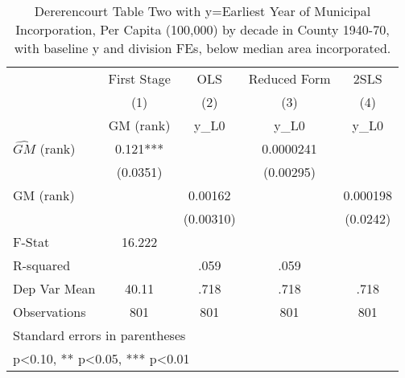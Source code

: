 \begin{table}[htbp]\centering
\def\sym#1{\ifmmode^{#1}\else\(^{#1}\)\fi}
\caption{Dererencourt Table Two with y=Earliest Year of Municipal Incorporation, Per Capita (100,000) by decade in County 1940-70, with baseline y and division FEs, below median area incorporated.}
\begin{tabular}{l*{4}{c}}
\toprule
                    & First Stage   &         OLS   &Reduced Form   &        2SLS   \\
                    &\multicolumn{1}{c}{(1)}&\multicolumn{1}{c}{(2)}&\multicolumn{1}{c}{(3)}&\multicolumn{1}{c}{(4)}\\
                    &\multicolumn{1}{c}{GM  (rank)}&\multicolumn{1}{c}{y\_L0}&\multicolumn{1}{c}{y\_L0}&\multicolumn{1}{c}{y\_L0}\\
\midrule
$\hat{GM}$ (rank)   &       0.121***&               &   0.0000241   &               \\
                    &    (0.0351)   &               &   (0.00295)   &               \\
\addlinespace
GM  (rank)          &               &     0.00162   &               &    0.000198   \\
                    &               &   (0.00310)   &               &    (0.0242)   \\
\midrule
F-Stat              &      16.222   &               &               &               \\
R-squared           &               &        .059   &        .059   &               \\
Dep Var Mean        &       40.11   &        .718   &        .718   &        .718   \\
Observations        &         801   &         801   &         801   &         801   \\
\bottomrule
\multicolumn{5}{l}{\footnotesize Standard errors in parentheses}\\
\multicolumn{5}{l}{\footnotesize * p<0.10, ** p<0.05, *** p<0.01}\\
\end{tabular}
\end{table}
